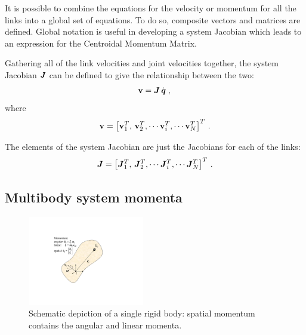 \documentclass{llncs}
\newcommand{\bJ}{\mbox{\boldmath $J$}}
\newcommand{\bq}{\mbox{\boldmath $q$}}
\newcommand{\vJ}{\vec{J}}
\newcommand{\bqd}{\dot{\bq}}
\newcommand{\bv}{{\bf v}}
\begin{document}
It is possible to combine the equations for the velocity or momentum
for all the links into a global set of equations.  To do
so, composite vectors and matrices are defined. %
Global notation is useful
in developing a system Jacobian which leads to an
expression for the Centroidal Momentum Matrix.

Gathering all of the link velocities and joint velocities together, the system Jacobian $\bJ$ can be defined to give the relationship between the two:
%
\begin{equation}
\label{eq:v}
\bv = \bJ \, \bqd \; ,\\
\end{equation}
%
where %
\begin{equation}
\bv = \left[ \bv_1^T, \, \bv_2^T, \cdots \bv_i^T, \cdots \bv_N^T \right]^T \, .
\end{equation}

The elements of the system Jacobian are just the Jacobians for each of the links:
%
\begin{equation}
\bJ = \left[ \vJ_1^T, \, \vJ_2^T, \cdots \vJ_i^T, \cdots \vJ_N^T \right]^T \, .
\end{equation}




\subsection{Multibody system momenta}

\begin{figure}[t]
\begin{center}
\includegraphics[width=2.0in]{Figures/fig1.pdf}
\end{center}
\caption{Schematic depiction of a single rigid body:
spatial momentum contains the angular and linear momenta.} \label{fig1}
\end{figure}
\end{document}
